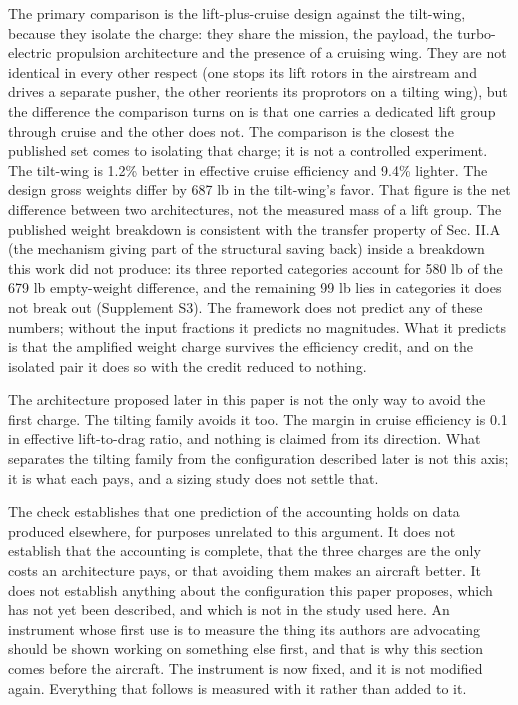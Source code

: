 \documentclass[journal]{new-aiaa}
\begin{document}
The primary comparison is the lift-plus-cruise design against the tilt-wing, because they isolate the charge: they share the mission, the payload, the turbo-electric propulsion architecture and the presence of a cruising wing. They are not identical in every other respect (one stops its lift rotors in the airstream and drives a separate pusher, the other reorients its proprotors on a tilting wing), but the difference the comparison turns on is that one carries a dedicated lift group through cruise and the other does not. The comparison is the closest the published set comes to isolating that charge; it is not a controlled experiment. The tilt-wing is 1.2\% better in effective cruise efficiency and 9.4\% lighter. The design gross weights differ by 687 lb in the tilt-wing's favor. That figure is the net difference between two architectures, not the measured mass of a lift group. The published weight breakdown is consistent with the transfer property of Sec. II.A (the mechanism giving part of the structural saving back) inside a breakdown this work did not produce: its three reported categories account for 580 lb of the 679 lb empty-weight difference, and the remaining 99 lb lies in categories it does not break out (Supplement S3). The framework does not predict any of these numbers; without the input fractions it predicts no magnitudes. What it predicts is that the amplified weight charge survives the efficiency credit, and on the isolated pair it does so with the credit reduced to nothing.

The architecture proposed later in this paper is not the only way to avoid the first charge. The tilting family avoids it too. The margin in cruise efficiency is 0.1 in effective lift-to-drag ratio, and nothing is claimed from its direction. What separates the tilting family from the configuration described later is not this axis; it is what each pays, and a sizing study does not settle that.

The check establishes that one prediction of the accounting holds on data produced elsewhere, for purposes unrelated to this argument. It does not establish that the accounting is complete, that the three charges are the only costs an architecture pays, or that avoiding them makes an aircraft better. It does not establish anything about the configuration this paper proposes, which has not yet been described, and which is not in the study used here. An instrument whose first use is to measure the thing its authors are advocating should be shown working on something else first, and that is why this section comes before the aircraft. The instrument is now fixed, and it is not modified again. Everything that follows is measured with it rather than added to it.
\end{document}
